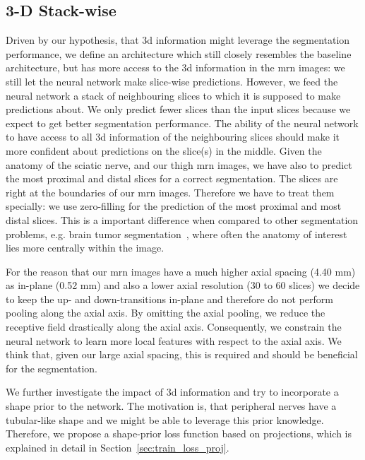 \subsection{3-D Stack-wise}
Driven by our hypothesis, that \gls{3d} information might leverage the segmentation performance, we define an architecture which still closely resembles the baseline architecture, but has more access to the \gls{3d} information in the \gls{mrn} images: we still let the neural network make slice-wise predictions. However, we feed the neural network a stack of neighbouring slices to which it is supposed to make predictions about. We only predict fewer slices than the input slices because we expect to get better segmentation performance. The ability of the neural network to have access to all \gls{3d} information of the neighbouring slices should make it more confident about predictions on the slice(s) in the middle. Given the anatomy of the sciatic nerve, and our thigh \gls{mrn} images, we have also to predict the most proximal and distal slices for a correct segmentation. The slices are right at the boundaries of our \gls{mrn} images. Therefore we have to treat them specially: we use zero-filling for the prediction of the most proximal and most distal slices. This is a important difference when compared to other segmentation problems, e.g. brain tumor segmentation~\cite{Menze2015TheBRATS}, where often the anatomy of interest lies more centrally within the image.

For the reason that our \gls{mrn} images have a much higher axial spacing (4.40 mm) as in-plane (0.52 mm) and also a lower axial resolution (30 to 60 slices) we decide to keep the up- and down-transitions in-plane and therefore do not perform pooling along the axial axis. By omitting the axial pooling, we reduce the receptive field drastically along the axial axis. Consequently, we constrain the neural network to learn more local features with respect to the axial axis. We think that, given our large axial spacing, this is required and should be beneficial for the segmentation.

We further investigate the impact of \gls{3d} information and try to incorporate a shape prior to the network. The motivation is, that peripheral nerves have a tubular-like shape and we might be able to leverage this prior knowledge. Therefore, we propose a shape-prior loss function based on projections, which is explained in detail in Section~\ref{sec:train_loss_proj}.


